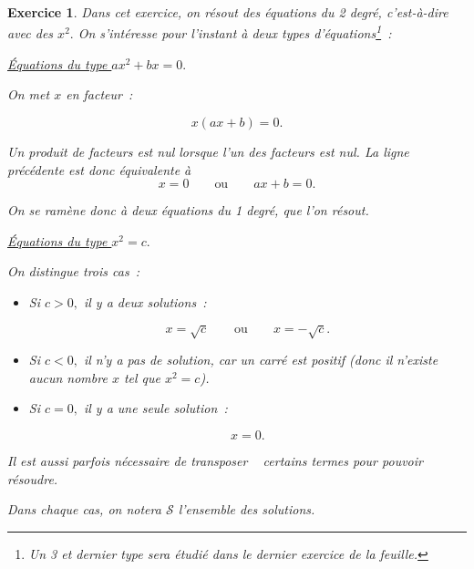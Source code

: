 \documentclass[10pt]{article}
\newtheorem{exo}{Exercice}
\begin{document}
\begin{exo}

Dans cet exercice, on résout des équations du 2 degré, c'est-à-dire avec des $x^2.$ 
On s'intéresse pour l'instant à deux types d'équations\footnote{Un 3 et dernier type sera étudié dans le dernier exercice de la feuille.}~:

\setlength{\columnseprule}{0.5pt}

\begin{multicols}{2}

\underline{Équations du type $ax^2+bx=0.$}

\medskip

On met $x$ en facteur~:

\[x(ax+b)=0.\]

Un produit de facteurs est nul lorsque l'un des facteurs est nul. La ligne précédente est donc équivalente à
\[x=0\qquad\text{ou}\qquad ax+b=0.\]

On se ramène donc à deux équations du 1 degré, que l'on résout.
\columnbreak

\underline{Équations du type $x^2=c.$}

\medskip

On distingue trois cas~:

\begin{itemize}
\item[\textbullet] Si $c>0,$ il y a deux solutions~:

\[x=\sqrt{c}\qquad\text{ou}\qquad x=-\sqrt{c}.\]

\item[\textbullet] Si $c<0,$ il n'y a pas de solution, car un carré est positif (donc il n'existe aucun nombre $x$ tel que $x^2=c$).
\item[\textbullet] Si $c=0,$ il y a une seule solution~: 

\[x=0.\]
\end{itemize}

\end{multicols}

\medskip

Il est aussi parfois nécessaire de \og transposer \fg~{} certains termes pour pouvoir résoudre.

\medskip

Dans chaque cas, on notera $\mathcal{S}$ l'ensemble des solutions.

\setlength{\columnseprule}{0.5pt}


\end{exo}
\end{document}
